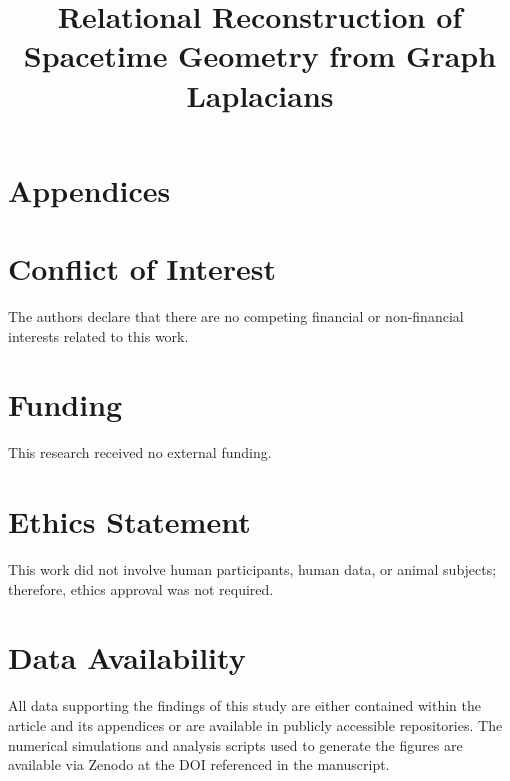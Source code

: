 \documentclass[pdflatex,sn-mathphys-num]{sn-jnl} %
\title[Emergent Metricity from Spectral Connectivity]
{Relational Reconstruction of Spacetime Geometry from Graph Laplacians}
\author*[1]{\fnm{Jérôme} \sur{Beau}}\email{jerome.beau@cosmochrony.org}
\affil*[1]{\orgname{Independent Researcher}, \country{France}}
\date{}
\theoremstyle{remark}
\theoremstyle{plain}
\begin{document}
  \maketitle

  \clearpage
  \tableofcontents

  
  
  
  
  
  
  

  \appendix
  \clearpage

  \section*{Appendices}
    
    
    

    \backmatter

  \section*{Conflict of Interest}
    The authors declare that there are no competing financial or non-financial interests related to this work.

  \section*{Funding}
    This research received no external funding.

  \section*{Ethics Statement}
    This work did not involve human participants, human data, or animal subjects; therefore, ethics
    approval was not required.

  \section*{Data Availability}
    All data supporting the findings of this study are either contained within the article and its appendices or are
    available in publicly accessible repositories.
    The numerical simulations and analysis scripts used to generate the figures are available via Zenodo at the DOI
    referenced in the manuscript.
\end{document}
